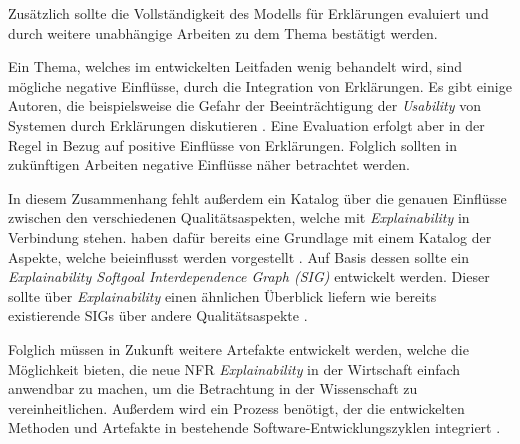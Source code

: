 Zusätzlich sollte die Vollständigkeit des Modells für Erklärungen evaluiert und durch weitere unabhängige Arbeiten zu dem Thema bestätigt werden.

Ein Thema, welches im entwickelten Leitfaden wenig behandelt wird, sind mögliche negative Einflüsse, durch die Integration von Erklärungen. Es gibt einige Autoren, die beispielsweise die Gefahr der Beeinträchtigung der \textit{Usability} von Systemen durch Erklärungen diskutieren \cite{chazette_knowledge_nodate,koo_understanding_2016,kohl_explainability_2019}. Eine Evaluation erfolgt aber in der Regel in Bezug auf positive Einflüsse von Erklärungen. 
Folglich sollten in zukünftigen Arbeiten negative Einflüsse näher  betrachtet werden.

In diesem Zusammenhang fehlt außerdem ein Katalog über die genauen Einflüsse zwischen den verschiedenen Qualitätsaspekten, welche mit \textit{Explainability} in Verbindung stehen. \citeauthor{chazette_knowledge_nodate} haben dafür bereits eine Grundlage mit einem Katalog der Aspekte, welche beieinflusst werden vorgestellt \cite{chazette_knowledge_nodate}. Auf Basis dessen sollte ein \textit{Explainability Softgoal Interdependence Graph (SIG)} entwickelt werden. Dieser sollte über \textit{Explainability} einen ähnlichen Überblick liefern wie bereits existierende SIGs über andere Qualitätsaspekte \cite[vgl.][]{do2010software, carvalho2020developers}.

Folglich müssen in Zukunft weitere Artefakte entwickelt werden, welche die Möglichkeit bieten, die neue NFR \textit{Explainability} in der Wirtschaft einfach anwendbar zu machen, um die Betrachtung in der Wissenschaft zu vereinheitlichen\cite{sokol_explainability_2020}. Außerdem wird ein Prozess benötigt, der die entwickelten Methoden und Artefakte in bestehende Software-Entwicklungszyklen integriert \cite{kohl_explainability_2019, cassens_ambient_2019}.